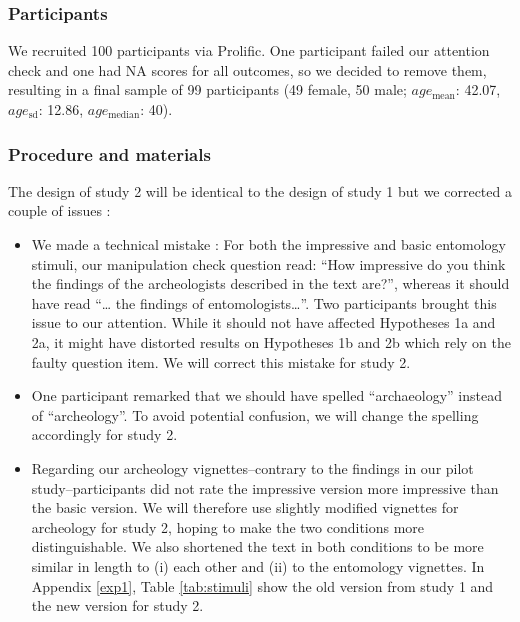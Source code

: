 \documentclass[
  doc,floatsintext]{apa6}
\begin{document}
\hypertarget{participants-1}{%
\subsubsection{Participants}\label{participants-1}}

We recruited 100 participants via Prolific. One participant failed our attention check and one had NA scores for all outcomes, so we decided to remove them, resulting in a final sample of 99 participants (49 female, 50 male; \(age_\text{mean}\): 42.07, \(age_\text{sd}\): 12.86, \(age_\text{median}\): 40).

\hypertarget{procedure-and-materials}{%
\subsubsection{Procedure and materials}\label{procedure-and-materials}}

The design of study 2 will be identical to the design of study 1 but we corrected a couple of issues :

\begin{itemize}
\item
  We made a technical mistake : For both the impressive and basic entomology stimuli, our manipulation check question read: ``How impressive do you think the findings of the archeologists described in the text are?'', whereas it should have read ``\ldots{} the findings of entomologists\ldots{}''. Two participants brought this issue to our attention. While it should not have affected Hypotheses 1a and 2a, it might have distorted results on Hypotheses 1b and 2b which rely on the faulty question item. We will correct this mistake for study 2.
\item
  One participant remarked that we should have spelled ``archaeology'' instead of ``archeology''. To avoid potential confusion, we will change the spelling accordingly for study 2.
\item
  Regarding our archeology vignettes--contrary to the findings in our pilot study--participants did not rate the impressive version more impressive than the basic version. We will therefore use slightly modified vignettes for archeology for study 2, hoping to make the two conditions more distinguishable. We also shortened the text in both conditions to be more similar in length to (i) each other and (ii) to the entomology vignettes. In Appendix \ref{exp1}, Table \ref{tab:stimuli} show the old version from study 1 and the new version for study 2.
\end{itemize}
\end{document}
